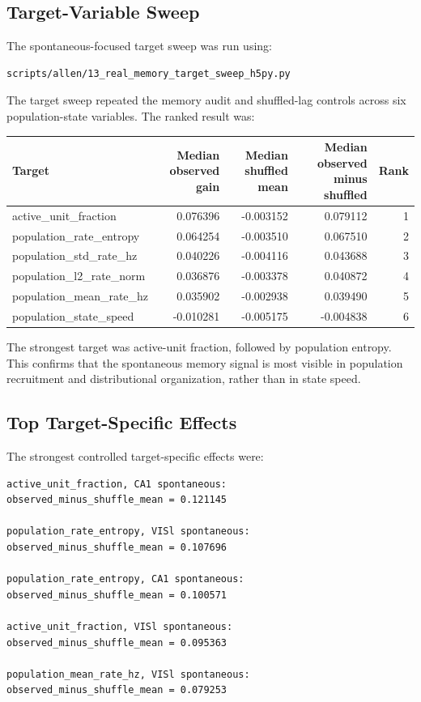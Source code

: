 \subsection{Target-Variable Sweep}

The spontaneous-focused target sweep was run using:

\begin{verbatim}
scripts/allen/13_real_memory_target_sweep_h5py.py
\end{verbatim}

The target sweep repeated the memory audit and shuffled-lag controls across six population-state variables. The ranked result was:

\begin{center}
\begin{tabular}{lrrrr}
\hline
Target & Median observed gain & Median shuffled mean & Median observed minus shuffled & Rank \\
\hline
active\_unit\_fraction & 0.076396 & -0.003152 & 0.079112 & 1 \\
population\_rate\_entropy & 0.064254 & -0.003510 & 0.067510 & 2 \\
population\_std\_rate\_hz & 0.040226 & -0.004116 & 0.043688 & 3 \\
population\_l2\_rate\_norm & 0.036876 & -0.003378 & 0.040872 & 4 \\
population\_mean\_rate\_hz & 0.035902 & -0.002938 & 0.039490 & 5 \\
population\_state\_speed & -0.010281 & -0.005175 & -0.004838 & 6 \\
\hline
\end{tabular}
\end{center}

The strongest target was active-unit fraction, followed by population entropy. This confirms that the spontaneous memory signal is most visible in population recruitment and distributional organization, rather than in state speed.

\subsection{Top Target-Specific Effects}

The strongest controlled target-specific effects were:

\begin{verbatim}
active_unit_fraction, CA1 spontaneous:
observed_minus_shuffle_mean = 0.121145

population_rate_entropy, VISl spontaneous:
observed_minus_shuffle_mean = 0.107696

population_rate_entropy, CA1 spontaneous:
observed_minus_shuffle_mean = 0.100571

active_unit_fraction, VISl spontaneous:
observed_minus_shuffle_mean = 0.095363

population_mean_rate_hz, VISl spontaneous:
observed_minus_shuffle_mean = 0.079253
\end{verbatim}

